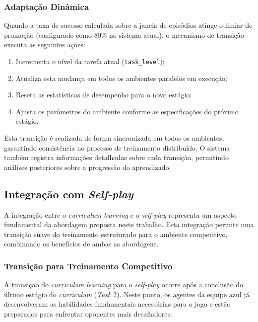 \subsubsection{Adaptação Dinâmica}

Quando a taxa de sucesso calculada sobre a janela de episódios atinge o limiar de promoção (configurado como 80\% no sistema atual), o mecanismo de transição executa as seguintes ações:

\begin{enumerate}
    \item Incrementa o nível da tarefa atual (\texttt{task\_level});
    \item Atualiza esta mudança em todos os ambientes paralelos em execução;
    \item Reseta as estatísticas de desempenho para o novo estágio;
    \item Ajusta os parâmetros do ambiente conforme as especificações do próximo estágio.
\end{enumerate}

Esta transição é realizada de forma sincronizada em todos os ambientes, garantindo consistência no processo de treinamento distribuído. O sistema também registra informações detalhadas sobre cada transição, permitindo análises posteriores sobre a progressão do aprendizado.

\subsection{Integração com \textit{Self-play}}
\label{subsec:integracao_selfplay}

A integração entre o \textit{curriculum learning} e o \textit{self-play} representa um aspecto fundamental da abordagem proposta neste trabalho. Esta integração permite uma transição suave do treinamento estruturado para o ambiente competitivo, combinando os benefícios de ambas as abordagens.

\subsubsection{Transição para Treinamento Competitivo}

A transição do \textit{curriculum learning} para o \textit{self-play} ocorre após a conclusão do último estágio do \textit{curriculum} (\textit{Task} 2). Neste ponto, os agentes da equipe azul já desenvolveram as habilidades fundamentais necessárias para o jogo e estão preparados para enfrentar oponentes mais desafiadores.

